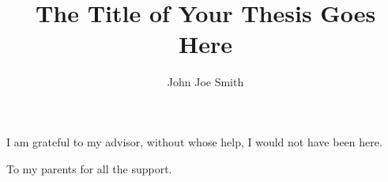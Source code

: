 \documentclass[oneside,final, letterpaper]{ucr}
\begin{document}


\title{The Title of Your Thesis Goes Here}
\author{John Joe Smith}

\maketitle
\copyrightpage{}
\approvalpage{}


\begin{frontmatter}

\begin{acknowledgements}
I am grateful to my advisor, without whose help, I would not have been here.
\end{acknowledgements}

\begin{dedication}
\null\vfil
{\large
\begin{center}
To my parents for all the support.
\end{center}}
\vfil\null
\end{dedication}



\tableofcontents
\listoffigures
\listoftables
\end{frontmatter}










\nocite{*}
% 




\end{document}
